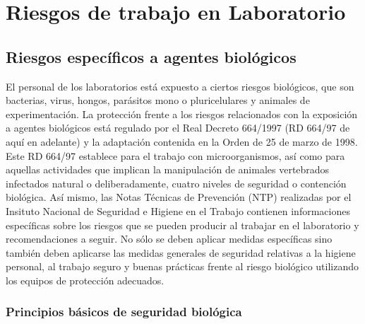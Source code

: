 \chapter{Riesgos de trabajo en Laboratorio}
\section{Riesgos específicos a agentes biológicos}
El personal de los laboratorios está expuesto a ciertos riesgos biológicos, que son bacterias, virus, hongos, parásitos mono o pluricelulares y animales de experimentación. La protección frente a los riesgos relacionados con la exposición a agentes biológicos está regulado por el Real Decreto 664/1997 (RD 664/97 de aquí en adelante) y la adaptación contenida en la Orden de 25 de marzo de 1998. Este RD 664/97 establece para el trabajo con microorganismos, así como para aquellas actividades que implican la manipulación de animales vertebrados infectados natural o deliberadamente, cuatro niveles de seguridad o contención biológica. Así mismo, las Notas Técnicas de Prevención (NTP) realizadas por el Insituto Nacional de Seguridad e Higiene en el Trabajo contienen informaciones específicas sobre los riesgos que se pueden producir al trabajar en el laboratorio y recomendaciones a seguir. No sólo se deben aplicar medidas específicas sino también deben aplicarse las medidas generales de seguridad relativas a la higiene personal, al trabajo seguro y buenas prácticas frente al riesgo biológico utilizando los equipos de protección adecuados.
\subsection{Principios básicos de seguridad biológica}
